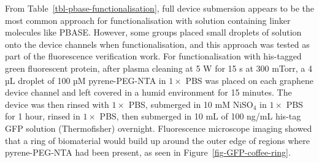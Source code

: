 \documentclass[
  a4paper,
]{scrbook}
\begin{document}
From Table~\ref{tbl-pbase-functionalisation}, full device submersion
appears to be the most common approach for functionalisation with
solution containing linker molecules like PBASE. However, some groups
placed small droplets of solution onto the device channels when
functionalisation, and this approach was tested as part of the
fluorescence verification work. For functionalisation with his-tagged
green fluorescent protein, after plasma cleaning at 5 W for 15 s at 300
mTorr, a 4 µL droplet of 100 µM pyrene-PEG-NTA in \(1 \times\) PBS was
placed on each graphene device channel and left covered in a humid
environment for 15 minutes. The device was then rinsed with \(1 \times\)
PBS, submerged in 10 mM NiSO\(_4\) in \(1 \times\) PBS for 1 hour,
rinsed in \(1 \times\) PBS, then submerged in 10 mL of 100 ng/mL his-tag
GFP solution (Thermofisher) overnight. Fluorescence microscope imaging
showed that a ring of biomaterial would build up around the outer edge
of regions where pyrene-PEG-NTA had been present, as seen in
Figure~\ref{fig-GFP-coffee-ring}.
\end{document}
